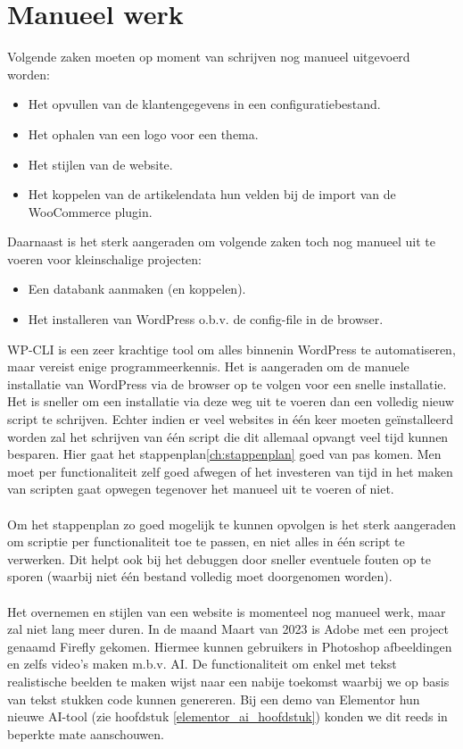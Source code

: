 \section{Manueel werk}
Volgende zaken moeten op moment van schrijven nog manueel uitgevoerd worden:
\begin{itemize}
    \item Het opvullen van de klantengegevens in een configuratiebestand.
    \item Het ophalen van een logo voor een thema.
    \item Het stijlen van de website.
    \item Het koppelen van de artikelendata hun velden bij de import van de WooCommerce plugin.
\end{itemize}
Daarnaast is het sterk aangeraden om volgende zaken toch nog manueel uit te voeren voor kleinschalige projecten:
\begin{itemize}
    \item Een databank aanmaken (en koppelen).
    \item Het installeren van WordPress o.b.v. de config-file in de browser.
\end{itemize}
WP-CLI is een zeer krachtige tool om alles binnenin WordPress te automatiseren, maar vereist enige programmeerkennis. Het is aangeraden om de manuele installatie van WordPress via de browser op te volgen voor een snelle installatie. Het is sneller om een installatie via deze weg uit te voeren dan een volledig nieuw script te schrijven. Echter indien er veel websites in één keer moeten geïnstalleerd worden zal het schrijven van één script die dit allemaal opvangt veel tijd kunnen besparen. Hier gaat het stappenplan\ref{ch:stappenplan} goed van pas komen. Men moet per functionaliteit zelf goed afwegen of het investeren van tijd in het maken van scripten gaat opwegen tegenover het manueel uit te voeren of niet.
\\\\
Om het stappenplan zo goed mogelijk te kunnen opvolgen is het sterk aangeraden om scriptie per functionaliteit toe te passen, en niet alles in één script te verwerken. Dit helpt ook bij het debuggen door sneller eventuele fouten op te sporen (waarbij niet één bestand volledig moet doorgenomen worden).
\\\\
Het overnemen en stijlen van een website is momenteel nog manueel werk, maar zal niet lang meer duren. In de maand Maart van 2023 is Adobe met een project genaamd Firefly gekomen. Hiermee kunnen gebruikers in Photoshop afbeeldingen en zelfs video's maken m.b.v. AI. De functionaliteit om enkel met tekst realistische beelden te maken wijst naar een nabije toekomst waarbij we op basis van tekst stukken code kunnen genereren. Bij een demo van Elementor hun nieuwe AI-tool (zie hoofdstuk \ref{elementor_ai_hoofdstuk}) konden we dit reeds in beperkte mate aanschouwen. 
\\\\
